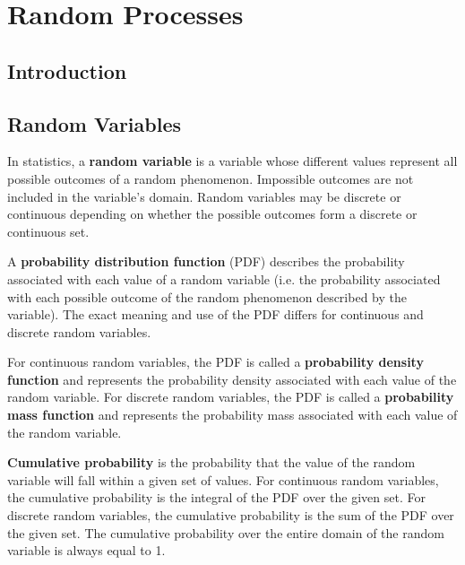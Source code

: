 \chapter{Random Processes}

\section{Introduction}

\section{Random Variables}
In statistics, a \textbf{random variable} is a variable whose different values represent all possible outcomes of a random phenomenon. Impossible outcomes are not included in the variable's domain. Random variables may be discrete or continuous depending on whether the possible outcomes form a discrete or continuous set.

\vspace{0.5cm}

A \textbf{probability distribution function} (PDF) describes the probability associated with each value of a random variable (i.e. the probability associated with each possible outcome of the random phenomenon described by the variable). The exact meaning and use of the PDF differs for continuous and discrete random variables.

\vspace{0.5cm}

For continuous random variables, the PDF is called a \textbf{probability density function} and represents the probability density associated with each value of the random variable. For discrete random variables, the PDF is called a \textbf{probability mass function} and represents the probability mass associated with each value of the random variable.

\textbf{Cumulative probability} is the probability that the value of the random variable will fall within a given set of values. For continuous random variables, the cumulative probability is the integral of the PDF over the given set. For discrete random variables, the cumulative probability is the sum of the PDF over the given set. The cumulative probability over the entire domain of the random variable is always equal to 1.

